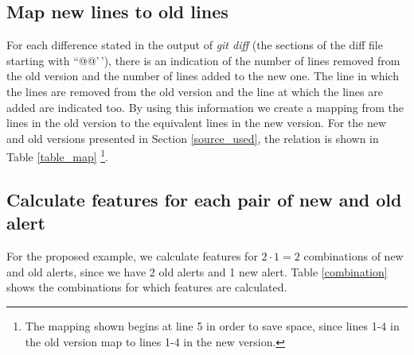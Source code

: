 \documentclass[
]{article}
\begin{document}
\normalsize

\subsection{Map new lines to old lines}\label{map}

For each difference stated in the output of \textit{git diff} (the
sections of the diff file starting with ``@@'\,'), there is an
indication of the number of lines removed from the old version and the
number of lines added to the new one. The line in which the lines are
removed from the old version and the line at which the lines are added
are indicated too. By using this information we create a mapping from
the lines in the old version to the equivalent lines in the new version.
For the new and old versions presented in Section \ref{source_used}, the
relation is shown in Table \ref{table_map}
\footnote{The mapping shown begins at line 5 in order to save space, since lines 1-4 in the old version map to lines 1-4 in the new version.}.

\small

\begin{table}[H]

\caption{\label{tab:showing map }Relation between lines of the old version and lines of the new version\label{table_map}}
\centering
{}
\end{table}

\normalsize

\subsection{Calculate features for each pair of new and old alert}

For the proposed example, we calculate features for \(2 \cdot 1 = 2\)
combinations of new and old alerts, since we have 2 old alerts and 1 new
alert. Table \ref{combination} shows the combinations for which features
are calculated.
\end{document}
